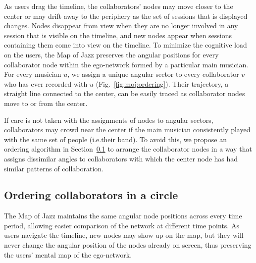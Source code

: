 \documentclass[12pt]{cmuthesis}
\begin{document}
  As users drag the timeline, the collaborators' nodes may move closer to the center or may drift away to the periphery as the set of sessions that is displayed changes. Nodes disappear from view when they are no longer involved in any session that is visible on the timeline, and new nodes appear when sessions containing them come into view on the timeline. To minimize the cognitive load on the users, the Map of Jazz preserves the angular positions for every collaborator node within the ego-network formed by a particular main musician. For every musician $u$, we assign a unique angular sector to every collaborator $v$ who has ever recorded with $u$ (Fig.~\ref{fig:moj:ordering}). Their trajectory, a straight line connected to the center, can be easily traced as collaborator nodes move to or from the center.

  If care is not taken with the assignments of nodes to angular sectors, collaborators may crowd near the center if the main musician consistently played with the same set of people (i.e.\@ their band). To avoid this, we propose an ordering algorithm in Section~\ref{sec:moj:ordering} to arrange the collaborator nodes in a way that assigns dissimilar angles to collaborators with which the center node has had similar patterns of collaboration.




  \subsection{Ordering collaborators in a circle}
  \label{sec:moj:ordering}


  The Map of Jazz maintains the same angular node positions across every time
  period, allowing easier comparison of the network at different time points. As
  users navigate the timeline, new nodes may show up on the map, but they will
  never change the angular position of the nodes already on screen, thus
  preserving the users' mental map of the ego-network.
\end{document}
